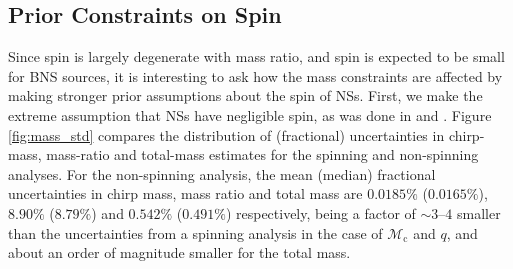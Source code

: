 \subsection{Prior Constraints on Spin}
\label{subsec:prior_constraints}

Since spin is largely degenerate with mass ratio, and spin is expected to be small for BNS sources, it is interesting to ask how the mass constraints are affected by making stronger prior assumptions about the spin of NSs.  First, we make the extreme assumption that NSs have negligible spin, as was done in \citet{Singer_2014} and \citet{Berry_2014}.  Figure \ref{fig:mass_std} compares the distribution of (fractional) uncertainties in chirp-mass, mass-ratio and total-mass estimates for the spinning and non-spinning analyses. For the non-spinning analysis, the mean (median) fractional uncertainties in chirp mass, mass ratio and total mass are $0.0185\%$ ($0.0165\%$), $8.90\%$ ($8.79\%$) and $0.542\%$ ($0.491\%$) respectively, being a factor of $\sim3$--$4$ smaller than the uncertainties from a spinning analysis in the case of $\mathcal{M}_\mathrm{c}$ and $q$, and about an order of magnitude smaller for the total mass.
  
  
  
  
  
  
  
  
  
  
  
  
  
  